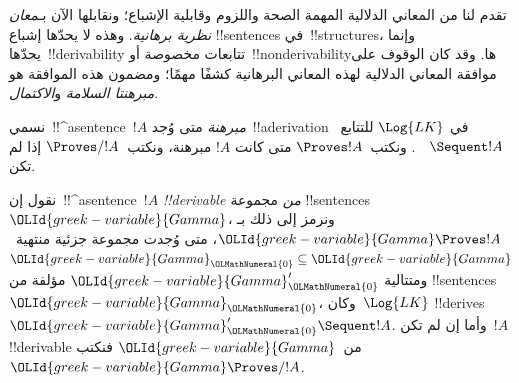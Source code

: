 \documentclass[../../../include/open-logic-section]{subfiles}
\begin{document}


\begin{explain}
تقدم لنا من المعاني الدلالية المهمة الصحة واللزوم وقابلية الإشباع؛
ونقابلها الآن بـ\emph{معان نظرية برهانية}. وهذه لا يحدّها إشباع
!!{sentence}s في~!!{structure}s، وإنما يحدّها~!!{derivability} تتابعات
مخصوصة أو~!!{nonderivability}ها. وقد كان الوقوف على موافقة المعاني
الدلالية لهذه المعاني البرهانية كشفًا مهمًا؛ ومضمون هذه الموافقة هو
\emph{مبرهنتا السلامة} و\emph{الاكتمال}.
\end{explain}

\begin{defn}[المبرهنات]
نسمي~!!^a{sentence}~$!A$ \emph{مبرهنة} متى وُجد~!!a{derivation} في
$\Log{LK}$ للتتابع~$\quad \Sequent !A$. ونكتب~$\Proves !A$ متى كانت
$!A$ مبرهنة، ونكتب~$\Proves/ !A$ إذا لم تكن.
\end{defn}

\begin{defn}[!!^{derivability}]
نقول إن~!!^a{sentence}~$!A$ \emph{!!{derivable} من} مجموعة
!!{sentence}s~$\OLId{greek-variable}{Gamma}$، ونرمز إلى ذلك بـ$\OLId{greek-variable}{Gamma} \Proves !A$، متى
وُجدت مجموعة جزئية منتهية~$\OLId{greek-variable}{Gamma}_\OLMathNumeral{0} \subseteq \OLId{greek-variable}{Gamma}$ ومتتالية
$\OLId{greek-variable}{Gamma}_\OLMathNumeral{0}'$ مؤلفة من !!{sentence}s~$\OLId{greek-variable}{Gamma}_\OLMathNumeral{0}$، وكان~$\Log{LK}$
!!{derive}s~$\OLId{greek-variable}{Gamma}_\OLMathNumeral{0}' \Sequent !A$. وأما إن لم تكن~$!A$
!!{derivable} من~$\OLId{greek-variable}{Gamma}$ فنكتب~$\OLId{greek-variable}{Gamma} \Proves/ !A$.
\end{defn}
\end{document}
